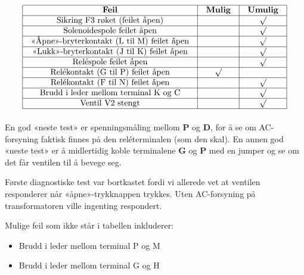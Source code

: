 






$$\vbox{\offinterlineskip
\halign{\strut
\vrule \quad\hfil # \ \hfil &
\vrule \quad\hfil # \ \hfil &
\vrule \quad\hfil # \ \hfil \vrule \cr
\noalign{\hrule}
%
{\bf Feil} & {\bf Mulig} & {\bf Umulig} \cr
%
\noalign{\hrule}
%
Sikring F3 røket (feilet åpen) &  & $\surd$ \cr
%
\noalign{\hrule}
%
Solenoidespole feilet åpen &  & $\surd$ \cr
%
\noalign{\hrule}
%
«Åpne»-bryterkontakt (L til M) feilet åpen &  & $\surd$ \cr
%
\noalign{\hrule}
%
«Lukk»-bryterkontakt (J til K) feilet åpen &  & $\surd$ \cr
%
\noalign{\hrule}
%
Reléspole feilet åpen &  & $\surd$ \cr
%
\noalign{\hrule}
%
Relékontakt (G til P) feilet åpen & $\surd$ &  \cr
%
\noalign{\hrule}
%
Relékontakt (F til N) feilet åpen &  & $\surd$ \cr
%
\noalign{\hrule}
%
Brudd i leder mellom terminal K og C &  & $\surd$ \cr
%
\noalign{\hrule}
%
Ventil V2 stengt &  & $\surd$ \cr
%
\noalign{\hrule}
} %
}$$ %

En god «neste test» er spenningsmåling mellom {\bf P} og {\bf D}, for å se om AC-forsyning faktisk finnes på den reléterminalen (som den skal). En annen god «neste test» er å midlertidig koble terminalene {\bf G} og {\bf P} med en jumper og se om det får ventilen til å bevege seg.







Første diagnostiske test var bortkastet fordi vi allerede vet at ventilen responderer når «åpne»-trykknappen trykkes. Uten AC-forsyning på transformatoren ville ingenting respondert.

\vskip 10pt

\noindent
Mulige feil som ikke står i tabellen inkluderer:

\begin{itemize}
\item{} Brudd i leder mellom terminal P og M
\item{} Brudd i leder mellom terminal G og H
\end{itemize}

